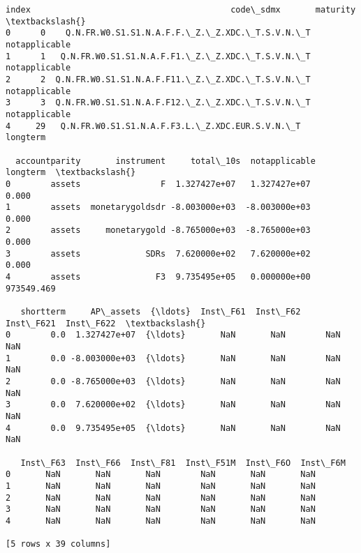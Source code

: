 \documentclass[11pt]{article}
\begin{document}
    \begin{Verbatim}[commandchars=\\\{\}]
   index                                        code\_sdmx       maturity  \textbackslash{}
0      0    Q.N.FR.W0.S1.S1.N.A.F.F.\_Z.\_Z.XDC.\_T.S.V.N.\_T  notapplicable
1      1   Q.N.FR.W0.S1.S1.N.A.F.F1.\_Z.\_Z.XDC.\_T.S.V.N.\_T  notapplicable
2      2  Q.N.FR.W0.S1.S1.N.A.F.F11.\_Z.\_Z.XDC.\_T.S.V.N.\_T  notapplicable
3      3  Q.N.FR.W0.S1.S1.N.A.F.F12.\_Z.\_Z.XDC.\_T.S.V.N.\_T  notapplicable
4     29   Q.N.FR.W0.S1.S1.N.A.F.F3.L.\_Z.XDC.EUR.S.V.N.\_T       longterm

  accountparity       instrument     total\_10s  notapplicable    longterm  \textbackslash{}
0        assets                F  1.327427e+07   1.327427e+07       0.000
1        assets  monetarygoldsdr -8.003000e+03  -8.003000e+03       0.000
2        assets     monetarygold -8.765000e+03  -8.765000e+03       0.000
3        assets             SDRs  7.620000e+02   7.620000e+02       0.000
4        assets               F3  9.735495e+05   0.000000e+00  973549.469

   shortterm     AP\_assets  {\ldots}  Inst\_F61  Inst\_F62  Inst\_F621  Inst\_F622  \textbackslash{}
0        0.0  1.327427e+07  {\ldots}       NaN       NaN        NaN        NaN
1        0.0 -8.003000e+03  {\ldots}       NaN       NaN        NaN        NaN
2        0.0 -8.765000e+03  {\ldots}       NaN       NaN        NaN        NaN
3        0.0  7.620000e+02  {\ldots}       NaN       NaN        NaN        NaN
4        0.0  9.735495e+05  {\ldots}       NaN       NaN        NaN        NaN

   Inst\_F63  Inst\_F66  Inst\_F81  Inst\_F51M  Inst\_F6O  Inst\_F6M
0       NaN       NaN       NaN        NaN       NaN       NaN
1       NaN       NaN       NaN        NaN       NaN       NaN
2       NaN       NaN       NaN        NaN       NaN       NaN
3       NaN       NaN       NaN        NaN       NaN       NaN
4       NaN       NaN       NaN        NaN       NaN       NaN

[5 rows x 39 columns]
    \end{Verbatim}
\end{document}
